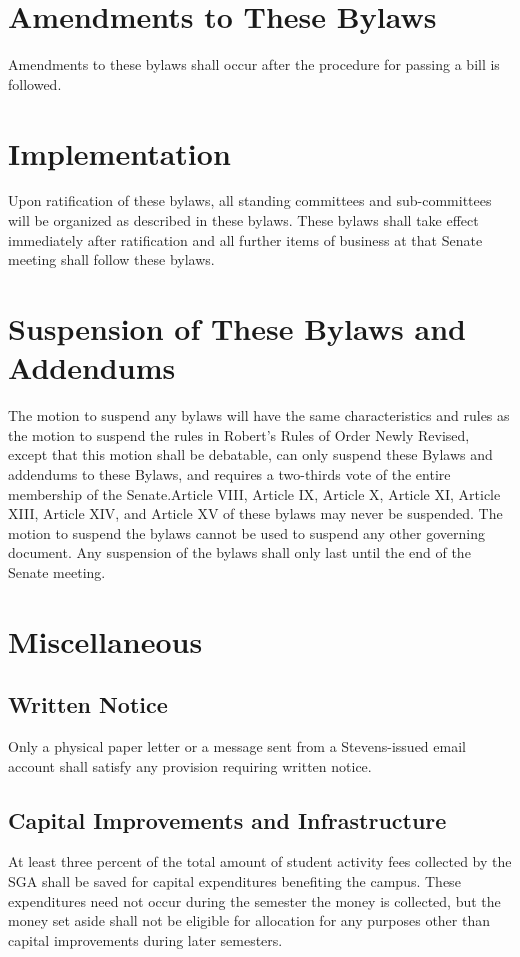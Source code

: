 \documentclass[12pt]{scrreprt}
\begin{document}
\chapter{Amendments to These Bylaws} \label{sec:amendments}
Amendments to these bylaws shall occur after the procedure for passing a bill 
is followed. 

\chapter{Implementation}
Upon ratification of these bylaws, all standing committees and sub-committees 
will be organized as described in these bylaws. These bylaws shall take effect 
immediately after ratification and all further items of business at that 
Senate meeting shall follow these bylaws. 

\chapter{Suspension of These Bylaws and Addendums} \label{sec:suspension}
The motion to suspend any bylaws will have the same characteristics and rules as the motion to
suspend the rules in Robert’s Rules of Order Newly Revised, except that this motion shall be
debatable, can only suspend these Bylaws and addendums to these Bylaws, and requires a two-thirds
vote of the entire membership of the Senate.Article VIII, Article IX, Article X, Article XI, Article XIII, Article XIV, and
Article XV of these bylaws may never be suspended. The motion to suspend the bylaws cannot be
used to suspend any other governing document. Any suspension of the bylaws shall only last until
the end of the Senate meeting. 

\chapter{Miscellaneous}

\section{Written Notice}
Only a physical paper letter or a message sent from a Stevens-issued email account shall satisfy any provision
requiring written notice.

\section{Capital Improvements and Infrastructure}
At least three percent of the total amount of student activity fees collected 
by the SGA shall be saved for capital expenditures benefiting the campus. 
These expenditures need not occur during the semester the money is collected, 
but the money set aside shall not be eligible for allocation for any purposes 
other than capital improvements during later semesters. 
\end{document}

